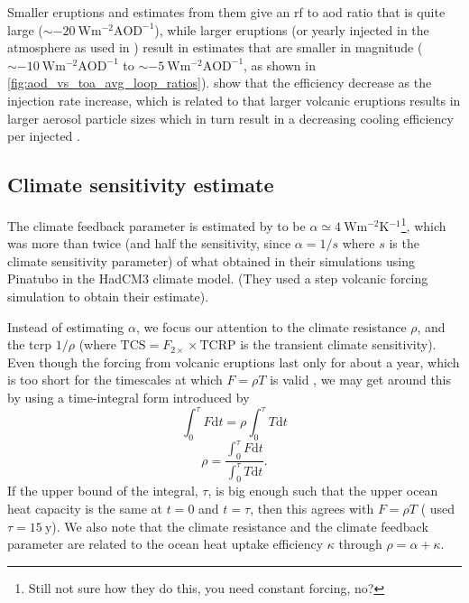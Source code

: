 \documentclass[twocol]{ametsocV6.1}
\newcommand{\iso}[1][i]{{#1}njected \ce{SO2}}
\begin{document}
Smaller eruptions and estimates from them give an \gls{rf} to \gls{aod} ratio that is
quite large (\(\sim \SI{-20}{\watt\metre^{-2}\mathrm{AOD}^{-1}}\)), while larger
eruptions (or yearly \iso{} in the atmosphere as used in \citet{niemeier2015}) result in
estimates that are smaller in magnitude (\(\sim
\SI{-10}{\watt\metre^{-2}\mathrm{AOD}^{-1}}\) to \(\sim
\SI{-5}{\watt\metre^{-2}\mathrm{AOD}^{-1}}\), as shown in
\ref{fig:aod_vs_toa_avg_loop_ratios}). \citet{niemeier2017} show that the efficiency
decrease as the injection rate increase, which is related to
that larger volcanic eruptions results in larger aerosol particle sizes which in turn
result in a decreasing cooling efficiency per \iso{} \citep{english2013, timmreck2018}.

\subsection{Climate sensitivity estimate}


The climate feedback parameter is estimated by \citet{jones2005} to be \(\alpha \simeq
\SI{4}{\watt\metre^{-2}\kelvin^{-1}}\)\footnote{Still not sure how they do this, you
  need constant forcing, no?}, which was more than twice (and half the sensitivity, since
\(\alpha =1/s\) where \(s\) is the climate sensitivity parameter) of what
\citet{gregory2016} obtained in their simulations using Pinatubo in the HadCM3 climate
model. (They used a step volcanic forcing simulation to obtain their estimate).

Instead of estimating \(\alpha \), we focus our attention to the climate resistance
\(\rho \), and the \gls{tcrp} \(1/\rho\) (where \(\mathrm{TCS}=F_{2\times}\times
\mathrm{TCRP}\) is the transient climate sensitivity). Even though the forcing from
volcanic eruptions last only for about a year, which is too short for the timescales at
which \(F=\rho T\) is valid \citep{gregory2016}, we may get around this by using a
time-integral form introduced by \citet{merlis2014}
\begin{equation}
  \int_0^{\tau}F \mathrm{d}t=\rho\int_{0}^{\tau}T \mathrm{d}t
\end{equation}
\begin{equation}
  \rho=\frac{\int_0^{\tau}F \mathrm{d}t}{\int_{0}^{\tau}T \mathrm{d}t}.
  \label{eq:climate-resistance}
\end{equation}
%
If the upper bound of the integral, \(\tau \), is big enough such that the upper ocean
heat capacity is the same at \(t=0\) and \(t=\tau \), then this agrees with \(F=\rho T\)
\citep{gregory2016} (\citet{merlis2014} used \(\tau =\SI{15}{\mathrm{y}}\)). We also
note that the climate resistance and the climate feedback parameter are related to the
ocean heat uptake efficiency \(\kappa \) through \(\rho =\alpha +\kappa \).
\end{document}
